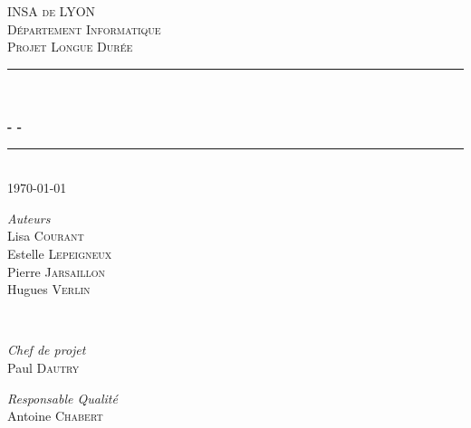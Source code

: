 \begin{titlepage}

\newcommand{\HRule}{\rule{\linewidth}{0.5mm}} %

\center %
 

\vspace*{1cm}

\textsc{\LARGE INSA de LYON}\\[1.5cm] 
\textsc{\Large D\'epartement Informatique}\\[0.5cm] 
\textsc{\large Projet Longue Durée}\\[0.5cm] %


\HRule \\[0.4cm]
{ \huge \bfseries \mainTitle}\\[0.1cm]
{\large \bfseries - \secondTitle -} 
\HRule \\[1.5cm]
 

{\large \today}\\[2cm] %
 

\begin{minipage}{0.4\textwidth}
\begin{center} \large
\emph{Auteurs} \\
Lisa \textsc{Courant} \\
Estelle \textsc{Lepeigneux} \\
Pierre \textsc{Jarsaillon} \\
Hugues \textsc{Verlin} \\
\end{center}
\end{minipage}
~
\begin{minipage}{0.4\textwidth}
\begin{center} \large
\emph{Chef de projet} \\
Paul \textsc{Dautry}
\end{center}
\begin{center} \large
\emph{Responsable Qualité} \\
Antoine \textsc{Chabert}
\end{center}
\end{minipage}\\[1cm]


\end{titlepage}
